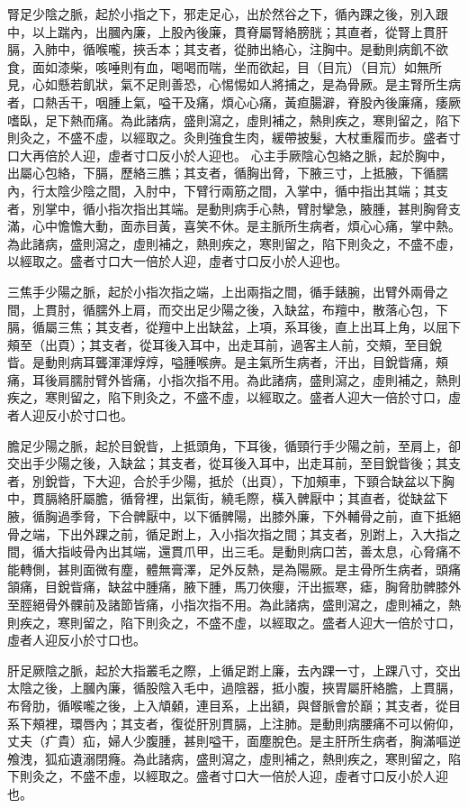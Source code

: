 腎足少陰之脈，起於小指之下，邪走足心，出於然谷之下，循內踝之後，別入跟中，以上踹內，出膕內廉，上股內後廉，貫脊屬腎絡膀胱；其直者，從腎上貫肝膈，入肺中，循喉嚨，挾舌本；其支者，從肺出絡心，注胸中。是動則病飢不欲食，面如漆柴，咳唾則有血，喝喝而喘，坐而欲起，目（目巟）（目巟）如無所見，心如懸若飢狀，氣不足則善恐，心惕惕如人將捕之，是為骨厥。是主腎所生病者，口熱舌干，咽腫上氣，嗌干及痛，煩心心痛，黃疸腸澼，脊股內後廉痛，痿厥嗜臥，足下熱而痛。為此諸病，盛則瀉之，虛則補之，熱則疾之，寒則留之，陷下則灸之，不盛不虛，以經取之。灸則強食生肉，緩帶披髮，大杖重履而步。盛者寸口大再倍於人迎，虛者寸口反小於人迎也。
心主手厥陰心包絡之脈，起於胸中，出屬心包絡，下膈，歷絡三膲；其支者，循胸出脅，下腋三寸，上抵腋，下循臑內，行太陰少陰之間，入肘中，下臂行兩筋之間，入掌中，循中指出其端；其支者，別掌中，循小指次指出其端。是動則病手心熱，臂肘攣急，腋腫，甚則胸脅支滿，心中憺憺大動，面赤目黃，喜笑不休。是主脈所生病者，煩心心痛，掌中熱。為此諸病，盛則瀉之，虛則補之，熱則疾之，寒則留之，陷下則灸之，不盛不虛，以經取之。盛者寸口大一倍於人迎，虛者寸口反小於人迎也。

三焦手少陽之脈，起於小指次指之端，上出兩指之間，循手錶腕，出臂外兩骨之間，上貫肘，循臑外上肩，而交出足少陽之後，入缺盆，布羶中，散落心包，下膈，循屬三焦；其支者，從羶中上出缺盆，上項，系耳後，直上出耳上角，以屈下頰至（出頁）；其支者，從耳後入耳中，出走耳前，過客主人前，交頰，至目銳眥。是動則病耳聾渾渾焞焞，嗌腫喉痹。是主氣所生病者，汗出，目銳眥痛，頰痛，耳後肩臑肘臂外皆痛，小指次指不用。為此諸病，盛則瀉之，虛則補之，熱則疾之，寒則留之，陷下則灸之，不盛不虛，以經取之。盛者人迎大一倍於寸口，虛者人迎反小於寸口也。

膽足少陽之脈，起於目銳眥，上抵頭角，下耳後，循頸行手少陽之前，至肩上，卻交出手少陽之後，入缺盆；其支者，從耳後入耳中，出走耳前，至目銳眥後；其支者，別銳眥，下大迎，合於手少陽，抵於（出頁），下加頰車，下頸合缺盆以下胸中，貫膈絡肝屬膽，循脅裡，出氣街，繞毛際，橫入髀厭中；其直者，從缺盆下腋，循胸過季脅，下合髀厭中，以下循髀陽，出膝外廉，下外輔骨之前，直下抵絕骨之端，下出外踝之前，循足跗上，入小指次指之間；其支者，別跗上，入大指之間，循大指岐骨內出其端，還貫爪甲，出三毛。是動則病口苦，善太息，心脅痛不能轉側，甚則面微有塵，體無膏澤，足外反熱，是為陽厥。是主骨所生病者，頭痛頷痛，目銳眥痛，缺盆中腫痛，腋下腫，馬刀俠癭，汗出振寒，瘧，胸脅肋髀膝外至脛絕骨外髁前及諸節皆痛，小指次指不用。為此諸病，盛則瀉之，虛則補之，熱則疾之，寒則留之，陷下則灸之，不盛不虛，以經取之。盛者人迎大一倍於寸口，虛者人迎反小於寸口也。

肝足厥陰之脈，起於大指叢毛之際，上循足跗上廉，去內踝一寸，上踝八寸，交出太陰之後，上膕內廉，循股陰入毛中，過陰器，抵小腹，挾胃屬肝絡膽，上貫膈，布脅肋，循喉嚨之後，上入頏顙，連目系，上出額，與督脈會於巔；其支者，從目系下頰裡，環唇內；其支者，復從肝別貫膈，上注肺。是動則病腰痛不可以俯仰，丈夫（疒貴）疝，婦人少腹腫，甚則嗌干，面塵脫色。是主肝所生病者，胸滿嘔逆飧洩，狐疝遺溺閉癃。為此諸病，盛則瀉之，虛則補之，熱則疾之，寒則留之，陷下則灸之，不盛不虛，以經取之。盛者寸口大一倍於人迎，虛者寸口反小於人迎也。

